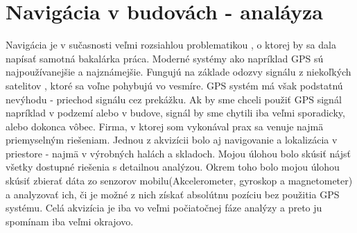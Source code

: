 \documentclass[11pt, oneside]{report}
\begin{document}
\section{Navigácia v budovách - analáyza}
Navigácia je v sučasnosti veľmi rozsiahlou problematikou , o ktorej by sa dala napísať samotná bakalárka práca. Moderné systémy ako napríklad GPS  sú najpoužívanejšie a najznámejšie. Fungujú  na základe odozvy signálu z niekoľkých satelitov , ktoré sa voľne pohybujú vo vesmíre.  GPS systém  má však podstatnú nevýhodu - priechod signálu cez prekážku. Ak by sme chceli použiť GPS signál  napríklad v podzemí alebo v budove, signál by sme  chytili iba veľmi sporadicky, alebo dokonca vôbec. Firma, v ktorej som vykonával prax sa venuje najmä priemyselným riešeniam. Jednou z akvizícii bolo  aj navigovanie  a lokalizácia v priestore - najmä v výrobných  halách a skladoch. Mojou úlohou bolo skúsiť  nájsť všetky dostupné riešenia  s detailnou analýzou. Okrem toho bolo mojou úlohou skúsiť zbierať  dáta zo senzorov mobilu(Akcelerometer, gyroskop a magnetometer)  a analyzovať ich, či je možné z nich získať  absolútnu pozíciu bez použitia GPS systému. Celá akvizícia je iba vo veľmi počiatočnej fáze  analýzy a preto ju spomínam iba veľmi okrajovo. 
\end{document}

